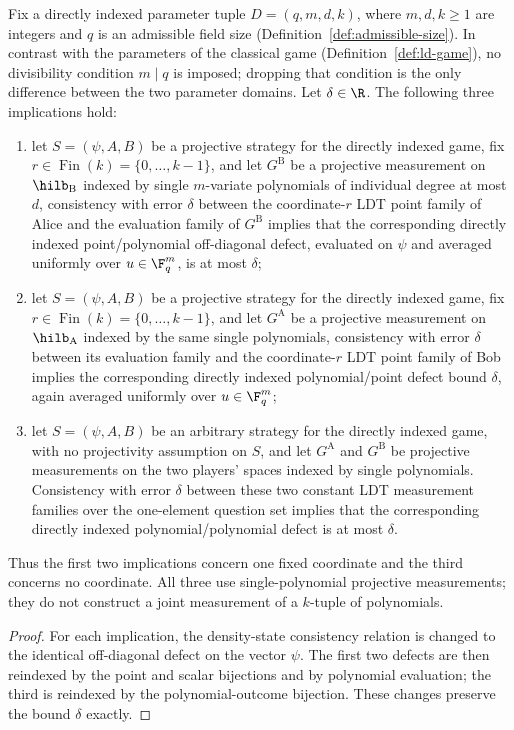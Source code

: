 \begin{lemma}
	Fix a directly indexed parameter tuple $D=(q,m,d,k)$, where $m,d,k \ge 1$
	are integers and $q$ is an admissible field size
	(Definition~\ref{def:admissible-size}). In contrast with the parameters of
	the classical game (Definition~\ref{def:ld-game}), no divisibility
	condition $m \mid q$ is imposed; dropping that condition is the only
	difference between the two parameter domains. Let $\delta\in\R$.
	The following three implications hold:
	\begin{enumerate}
		\item let $S=(\psi,A,B)$ be a projective strategy for the
		      directly indexed game, fix
		      $r\in\operatorname{Fin}(k)=\{0,\ldots,k-1\}$, and let
		      $G^{\mathrm B}$ be a projective measurement on
		      $\hilb_{\mathrm B}$ indexed by single $m$-variate
		      polynomials of individual degree at most $d$, consistency with
		      error $\delta$ between the coordinate-$r$ LDT point family of
		      Alice and the evaluation family of $G^{\mathrm B}$ implies
		      that the corresponding directly indexed point/polynomial
		      off-diagonal defect, evaluated on $\psi$ and averaged uniformly
		      over $u\in\F_q^m$, is at most $\delta$;
		\item let $S=(\psi,A,B)$ be a projective strategy for the
		      directly indexed game, fix
		      $r\in\operatorname{Fin}(k)=\{0,\ldots,k-1\}$, and let
		      $G^{\mathrm A}$ be a projective measurement on
		      $\hilb_{\mathrm A}$ indexed by the same single polynomials,
		      consistency with error $\delta$ between its evaluation family
		      and the coordinate-$r$ LDT point family of Bob implies the
		      corresponding directly indexed polynomial/point defect bound
		      $\delta$, again averaged uniformly over $u\in\F_q^m$;
		\item let $S=(\psi,A,B)$ be an arbitrary strategy for the
		      directly indexed game, with no projectivity assumption on $S$,
		      and let $G^{\mathrm A}$ and $G^{\mathrm B}$ be projective
		      measurements on the two players' spaces indexed by single
		      polynomials. Consistency with error $\delta$ between these two
		      constant LDT measurement families over the one-element question
		      set implies that the corresponding directly indexed
		      polynomial/polynomial defect is at most $\delta$.
	\end{enumerate}
	Thus the first two implications concern one fixed coordinate and the
	third concerns no coordinate. All three use single-polynomial projective
	measurements; they do not construct a joint measurement of a
	$k$-tuple of polynomials.
\end{lemma}
\begin{proof}
	\leanok
	For each implication, the density-state consistency relation is changed
	to the identical off-diagonal defect on the vector $\psi$. The first two
	defects are then reindexed by the point and scalar bijections and by
	polynomial evaluation; the third is reindexed by the polynomial-outcome
	bijection. These changes preserve the bound $\delta$ exactly.
\end{proof}

